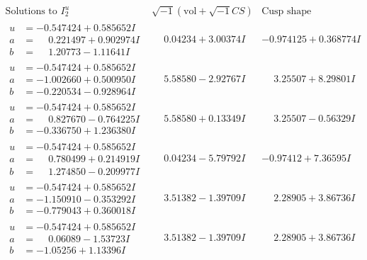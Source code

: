\documentclass[1p]{elsarticle_modified}
\theoremstyle{definition}
\newcommand{\I}{\sqrt{-1}}
\begin{document}
$$\begin{array}{c|c|c}  
\text{Solutions to }I^u_{2}& \I (\text{vol} + \sqrt{-1}CS) & \text{Cusp shape}\\
 \hline 
\begin{aligned}
u &= -0.547424 + 0.585652 I \\
a &= \phantom{-}0.221497 + 0.902974 I \\
b &= \phantom{-}1.20773 - 1.11641 I\end{aligned}
 & \phantom{-}0.04234 + 3.00374 I & -0.974125 + 0.368774 I \\ \hline\begin{aligned}
u &= -0.547424 + 0.585652 I \\
a &= -1.002660 + 0.500950 I \\
b &= -0.220534 - 0.928964 I\end{aligned}
 & \phantom{-}5.58580 - 2.92767 I & \phantom{-}3.25507 + 8.29801 I \\ \hline\begin{aligned}
u &= -0.547424 + 0.585652 I \\
a &= \phantom{-}0.827670 - 0.764225 I \\
b &= -0.336750 + 1.236380 I\end{aligned}
 & \phantom{-}5.58580 + 0.13349 I & \phantom{-}3.25507 - 0.56329 I \\ \hline\begin{aligned}
u &= -0.547424 + 0.585652 I \\
a &= \phantom{-}0.780499 + 0.214919 I \\
b &= \phantom{-}1.274850 - 0.209977 I\end{aligned}
 & \phantom{-}0.04234 - 5.79792 I & -0.97412 + 7.36595 I \\ \hline\begin{aligned}
u &= -0.547424 + 0.585652 I \\
a &= -1.150910 - 0.353292 I \\
b &= -0.779043 + 0.360018 I\end{aligned}
 & \phantom{-}3.51382 - 1.39709 I & \phantom{-}2.28905 + 3.86736 I \\ \hline\begin{aligned}
u &= -0.547424 + 0.585652 I \\
a &= \phantom{-}0.06089 - 1.53723 I \\
b &= -1.05256 + 1.13396 I\end{aligned}
 & \phantom{-}3.51382 - 1.39709 I & \phantom{-}2.28905 + 3.86736 I \\ \hline\begin{aligned}

\end{aligned}
\end{array}$$
\end{document}
